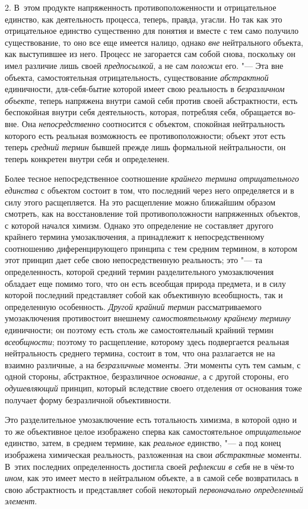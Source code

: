 {{2. В~этом продукте напряженность противоположенности и
отрицательное единство, как деятельность процесса, теперь, правда, угасли.
Но так как это отрицательное единство существенно для понятия и вместе с
тем само получило существование, то оно все еще имеется налицо, однако
{\em вне} нейтрального
объекта, как выступившее из него. Процесс не загорается сам собой снова,
поскольку он имел различие лишь своей
{\em предпосылкой}, а не
сам {\em положил} его. "---
Эта вне объекта, самостоятельная отрицательность,
существование {\em абстрактной}
единичности, для-себя-бытие которой имеет свою реальность в
{\em безразличном объекте},
теперь напряжена внутри самой себя против своей
абстрактности, есть беспокойная внутри себя деятельность, которая,
потребляя себя, обращается во-вне. Она
{\em непосредственно}
соотносится с объектом, спокойная нейтральность которого есть
реальная возможность ее противоположности; объект этот есть теперь
{\em средний термин}
бывшей прежде лишь формальной нейтральности, он теперь
конкретен внутри себя и определенен.

Более тесное непосредственное соотношение
{\em крайнего термина отрицательного
единства} с объектом состоит в том, что последний через него
определяется и в силу этого расщепляется. На это расщепление можно
ближайшим образом смотреть, как на восстановление той противоположности
напряженных объектов, с которой начался химизм. Однако это определение не
составляет другого крайнего термина умозаключения, а принадлежит к
непосредственному соотношению диференцирующего принципа с тем средним
термином, в котором этот принцип дает себе свою непосредственную
реальность; это "--- та определенность, которой средний термин
разделительного умозаключения обладает еще помимо того, что он есть
всеобщая природа предмета, и в силу которой последний представляет собой
как объективную всеобщность, так и определенную особенность.
{\em Другой крайний термин}
рассматриваемого умозаключения противостоит внешнему
{\em самостоятельному крайнему термину}
единичности; он поэтому есть столь же самостоятельный крайний
термин {\em всеобщности};
поэтому то расщепление, которому здесь подвергается реальная
нейтральность среднего термина, состоит в том, что она разлагается не на
взаимно различные, а на
{\em безразличные}
моменты. Эти моменты суть тем самым, с одной стороны,
абстрактное, безразличное
{\em основание}, а с
другой стороны, его {\em одушевляющий}
принцип, который вследствие своего отделения
от основания тоже получает форму безразличной объективности.

Это разделительное умозаключение есть тотальность химизма, в
которой одно и то же объективное целое изображено сперва как
самостоятельное {\em отрицательное}
единство, затем, в среднем термине, как
{\em реальное} единство,
"--- а под конец изображена химическая реальность, разложенная
на свои {\em абстрактные}
моменты. В~этих последних определенность достигла своей
{\em рефлексии в себя} не
в чём-то {\em ином},
как это имеет место в нейтральном объекте, а в самой себе
возвратилась в свою абстрактность и представляет собой некоторый
{\em первоначально определенный
элемент}.

}}
